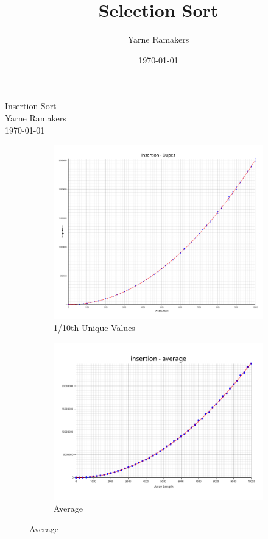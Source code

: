\documentclass[a4paper]{article}
\title{Selection Sort}
\author{Yarne Ramakers}
\date{\today}
\begin{document}
\begin{center}
  Insertion Sort \\
  Yarne Ramakers \\
  \today \\
\end{center}

\begin{figure}[h]
  \begin{subfigure}[b]{0.5\textwidth}
    \includegraphics[width=\textwidth]{../plots/insertion-dupes.png}
    \caption{1/10th Unique Values}
    \label{fig:insertion-dupes}
  \end{subfigure}
  \begin{subfigure}[b]{0.5\textwidth}
    \includegraphics[width=\textwidth]{../plots/insertion-average.png}
    \caption{Average}
    \label{fig:insertion-avg}
  \end{subfigure}\hfill
\end{figure}
\end{document}
